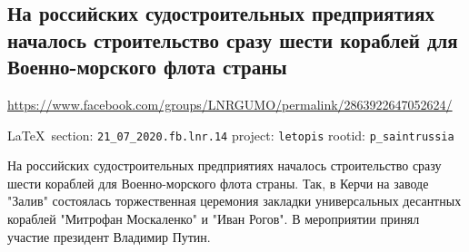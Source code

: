  
 
\subsection{На российских судостроительных предприятиях началось строительство сразу шести кораблей для Военно-морского флота страны}
\url{https://www.facebook.com/groups/LNRGUMO/permalink/2863922647052624/}
  
\vspace{0.5cm}
{\small\LaTeX~section: \verb|21_07_2020.fb.lnr.14| project: \verb|letopis| rootid: \verb|p_saintrussia|}
\vspace{0.5cm}

На российских судостроительных предприятиях началось строительство сразу шести
кораблей для Военно-морского флота страны. Так, в Керчи на заводе "Залив"
состоялась торжественная церемония закладки универсальных десантных кораблей
"Митрофан Москаленко" и "Иван Рогов". В мероприятии принял участие президент
Владимир Путин.
  
